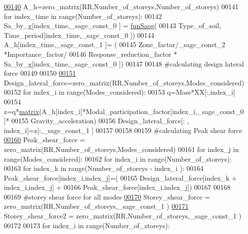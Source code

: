 \begin{DoxyCode}
\hypertarget{main_8sage_8py_source_l00140}{}\hyperlink{namespacemain_a49b10c1530f56b101c4cc17b20fb1973}{00140} A\_h=zero\_matrix(RR,Number\_of\_storeys,Number\_of\_storeys)
00141 \textcolor{keywordflow}{for} index\_time \textcolor{keywordflow}{in} range(Number\_of\_storeys):
00142     Sa\_by\_g[index\_time,\_sage\_const\_0 ] = \hyperlink{namespacemain_a4f60afd2426ee9409955e4352b3f0486}{funSaog}(
00143     Type\_of\_soil, Time\_period[index\_time,\_sage\_const\_0 ])
00144     A\_h[index\_time,\_sage\_const\_1 ]= (
00145     Zone\_factor/\_sage\_const\_2 *Importance\_factor/
00146     Response\_reduction\_factor * Sa\_by\_g[index\_time,\_sage\_const\_0 ])
00147 
00148 \textcolor{comment}{#calculating design lateral force}
00149 
00150 
\hypertarget{main_8sage_8py_source_l00151}{}\hyperlink{namespacemain_a0caf610899fee63b00acb7cce7c804d7}{00151} Design\_lateral\_force=zero\_matrix(RR,Number\_of\_storeys,Modes\_considered)
00152 \textcolor{keywordflow}{for} index\_i \textcolor{keywordflow}{in} range(Modes\_considered):
00153     q=Mass*XX[:,index\_i]
00154     z=q*\hyperlink{namespacecivilsage_1_1views_a8b58c93a9c82e84143c43dafaa744a4b}{matrix}(A\_h[index\_i]*Modal\_participation\_factor[index\_i,\_sage\_const\_0 ]*
00155     Gravity\_acceleration)
00156     Design\_lateral\_force[: , index\_i]=z[:,\_sage\_const\_1 ]
00157 
00158 
00159 \textcolor{comment}{#calculating Peak shear force}
\hypertarget{main_8sage_8py_source_l00160}{}\hyperlink{namespacemain_a9e135aea550f8ea419857f817a196d56}{00160} Peak\_shear\_force = zero\_matrix(RR,Number\_of\_storeys,Modes\_considered)
00161 \textcolor{keywordflow}{for} index\_j \textcolor{keywordflow}{in} range(Modes\_considered):
00162     \textcolor{keywordflow}{for} index\_i \textcolor{keywordflow}{in} range(Number\_of\_storeys):
00163         \textcolor{keywordflow}{for} index\_k \textcolor{keywordflow}{in} range(Number\_of\_storeys - index\_i ):
00164             Peak\_shear\_force[index\_i,index\_j]=(
00165             Design\_lateral\_force[index\_k + index\_i,index\_j] +
00166              Peak\_shear\_force[index\_i,index\_j])
00167 
00168 
00169 \textcolor{comment}{#storey shear force for all modes}
\hypertarget{main_8sage_8py_source_l00170}{}\hyperlink{namespacemain_aaa52e7055409dcf0785880422294a704}{00170} Storey\_shear\_force = zero\_matrix(RR,Number\_of\_storeys,\_sage\_const\_1 )
\hypertarget{main_8sage_8py_source_l00171}{}\hyperlink{namespacemain_ab6dd9cc05fd903a9da8b9734c44fef57}{00171} Storey\_shear\_force2 = zero\_matrix(RR,Number\_of\_storeys,\_sage\_const\_1 )
00172 
00173 \textcolor{keywordflow}{for} index\_i \textcolor{keywordflow}{in} range(Number\_of\_storeys):

\end{DoxyCode}
